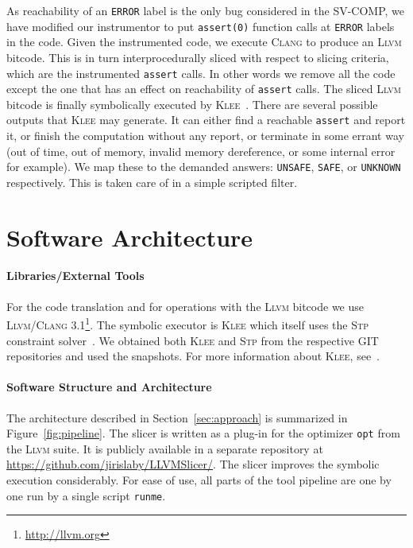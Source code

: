 \documentclass[10pt]{llncs}
\begin{document}
As reachability of an \texttt{ERROR} label is the only bug considered in the
SV-COMP, we have modified our instrumentor to put \texttt{assert(0)}
function calls at \texttt{ERROR} labels in the code. Given the instrumented
code, we execute \textsc{Clang} to produce an \textsc{Llvm} bitcode. This is
in turn interprocedurally sliced with respect to slicing criteria, which are
the instrumented \texttt{assert} calls. In other words we remove all the
code except the one that has an effect on reachability of \texttt{assert}
calls. The sliced \textsc{Llvm} bitcode is finally symbolically executed by
\textsc{Klee}~\cite{klee}. There are several possible outputs that
\textsc{Klee} may generate. It can either find a reachable \texttt{assert}
and report it, or finish the computation without any report, or terminate in
some errant way (out of time, out of memory, invalid memory dereference, or
some internal error for example). We map these to the demanded answers:
\texttt{UNSAFE}, \texttt{SAFE}, or \texttt{UNKNOWN} respectively. This is
taken care of in a simple scripted filter.


\section{Software Architecture}
\paragraph{Libraries/External Tools} For the code translation and for
operations with the \textsc{Llvm} bitcode we use
\textsc{Llvm}/\textsc{Clang} 3.1\footnote{\url{http://llvm.org}}. The
symbolic executor is \textsc{Klee} which itself uses the
\textsc{Stp} constraint solver~\cite{stp}. We obtained both \textsc{Klee} and
\textsc{Stp} from the respective GIT repositories and used the snapshots. For
more information about \textsc{Klee}, see~\cite{klee}.

\paragraph{Software Structure and Architecture} The architecture described
in Section~\ref{sec:approach} is summarized in Figure~\ref{fig:pipeline}.
The slicer is written as a plug-in for the optimizer \texttt{opt} from the
\textsc{Llvm} suite. It is publicly available in a separate repository at
\url{https://github.com/jirislaby/LLVMSlicer/}. The slicer improves the
symbolic execution considerably. For ease of use, all parts of the tool
pipeline are one by one run by a single script \texttt{runme}.
\end{document}
